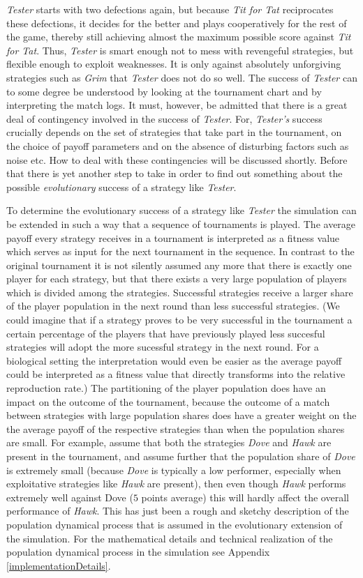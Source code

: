 {\em Tester} starts with two defections again, but because {\em Tit for Tat}
reciprocates these defections, it decides for the better and plays
cooperatively for the rest of the game, thereby still achieving almost the
maximum possible score against {\em Tit for Tat}.  Thus, {\em Tester} is smart
enough not to mess with revengeful strategies, but flexible enough to
exploit weaknesses. It is only against absolutely unforgiving strategies such
as {\em Grim} that {\em Tester} does not do so well. The success of {\em
  Tester} can to some degree be understood by looking at the tournament chart
and by interpreting the match logs. It must, however, be admitted that there
is a great deal of contingency involved in the success of {\em Tester}. For,
{\em Tester's} success crucially depends on the set of strategies that take
part in the tournament, on the choice of payoff parameters and on the absence
of disturbing factors such as noise etc. How to deal with these contingencies
will be discussed shortly.  Before that there is yet another step to take in
order to find out something about the possible {\em evolutionary} success of a
strategy like {\em Tester}.

To determine the evolutionary success of a strategy like {\em Tester} the
simulation can be extended in such a way that a sequence of tournaments is
played. The average payoff every strategy receives in a tournament is
interpreted as a fitness value which serves as input for the next tournament
in the sequence. In contrast to the original tournament it is not silently
assumed any more that there is exactly one player for each strategy, but that
there exists a very large population of players which is divided among the
strategies.  Successful strategies receive a larger share of the player
population in the next round than less successful strategies.
(We could imagine that if a strategy proves to be very
successful in the tournament a certain percentage of the players that have
previously played less succesful strategies will adopt the more sucessful
strategy in the next round. For a biological setting the interpretation would
even be easier as the average payoff could be interpreted as a fitness value
that directly transforms into the relative reproduction rate.)
The partitioning of the player population does have an impact on the outcome
of the tournament, because the outcome of a match between strategies with
large population shares does have a greater weight on the the average payoff
of the respective strategies than when the population shares are small. For
example, assume that both the strategies {\em Dove} and {\em Hawk} are present
in the tournament, and assume further that the population share of {\em Dove}
is extremely small (because {\em Dove} is typically a low performer,
especially when exploitative strategies like {\em Hawk} are present), then
even though {\em Hawk} performs extremely well against Dove ($5$ points
average) this will hardly affect the overall performance of {\em Hawk}. This
has just been a rough and sketchy description of the population dynamical
process that is assumed in the evolutionary extension of the simulation. For
the mathematical details and technical realization of the population dynamical
process in the simulation see Appendix \ref{implementationDetails}.


